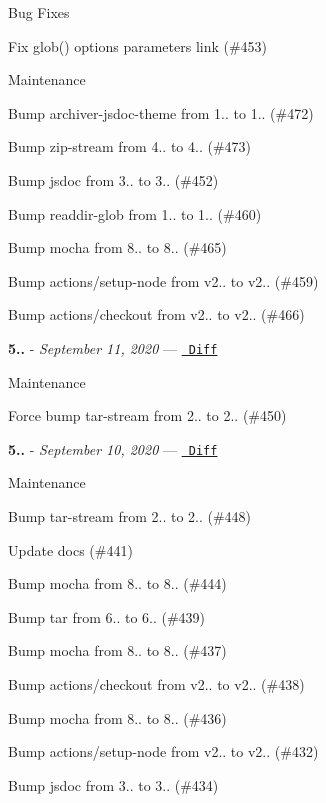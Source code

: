 Bug Fixes


\begin{DoxyItemize}
\item Fix glob() {\ttfamily options} parameter\textquotesingle{}s link (\#453)
\end{DoxyItemize}

Maintenance


\begin{DoxyItemize}
\item Bump archiver-\/jsdoc-\/theme from 1.. to 1.. (\#472)
\item Bump zip-\/stream from 4.. to 4.. (\#473)
\item Bump jsdoc from 3.. to 3.. (\#452)
\item Bump readdir-\/glob from 1.. to 1.. (\#460)
\item Bump mocha from 8.. to 8.. (\#465)
\item Bump actions/setup-\/node from v2.. to v2.. (\#459)
\item Bump actions/checkout from v2.. to v2.. (\#466)
\end{DoxyItemize}

{\bfseries{5..}} -\/ 
\footnotesize {\itshape September 11, 2020}
\normalsize  — \href{https://github.com/archiverjs/node-archiver/compare/5.0.1...5.0.2}{\texttt{ Diff}}

Maintenance


\begin{DoxyItemize}
\item Force bump tar-\/stream from 2.. to 2.. (\#450)
\end{DoxyItemize}

{\bfseries{5..}} -\/ 
\footnotesize {\itshape September 10, 2020}
\normalsize  — \href{https://github.com/archiverjs/node-archiver/compare/5.0.0...5.0.1}{\texttt{ Diff}}

Maintenance


\begin{DoxyItemize}
\item Bump tar-\/stream from 2.. to 2.. (\#448)
\item Update docs (\#441)
\item Bump mocha from 8.. to 8.. (\#444)
\item Bump tar from 6.. to 6.. (\#439)
\item Bump mocha from 8.. to 8.. (\#437)
\item Bump actions/checkout from v2.. to v2.. (\#438)
\item Bump mocha from 8.. to 8.. (\#436)
\item Bump actions/setup-\/node from v2.. to v2.. (\#432)
\item Bump jsdoc from 3.. to 3.. (\#434)
\end{DoxyItemize}

